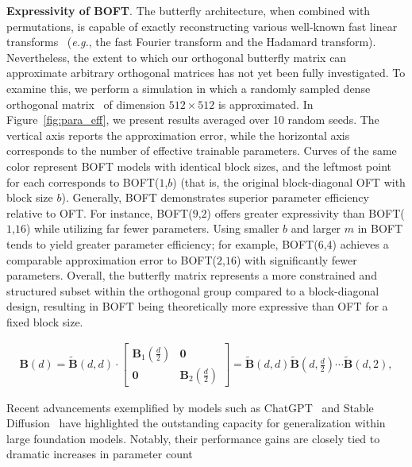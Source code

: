 \textbf{Expressivity of BOFT}. The butterfly architecture, when combined with permutations, is capable of exactly reconstructing various well-known fast linear transforms~\cite{dao2019learning,dao2019kaleidoscope} (\emph{e.g.}, the fast Fourier transform and the Hadamard transform). Nevertheless, the extent to which our orthogonal butterfly matrix can approximate arbitrary orthogonal matrices has not yet been fully investigated. To examine this, we perform a simulation in which a randomly sampled dense orthogonal matrix~\cite{anderson1987generation} of dimension $512\times 512$ is approximated. In Figure~\ref{fig:para_eff}, we present results averaged over 10 random seeds. The vertical axis reports the approximation error, while the horizontal axis corresponds to the number of effective trainable parameters. Curves of the same color represent BOFT models with identical block sizes, and the leftmost point for each corresponds to BOFT($1$,$b$) (that is, the original block-diagonal OFT with block size $b$). Generally, BOFT demonstrates superior parameter efficiency relative to OFT. For instance, BOFT($9$,$2$) offers greater expressivity than BOFT($1$,$16$) while utilizing far fewer parameters. Using smaller $b$ and larger $m$ in BOFT tends to yield greater parameter efficiency; for example, BOFT($6$,$4$) achieves a comparable approximation error to BOFT($2$,$16$) with significantly fewer parameters. Overall, the butterfly matrix represents a more constrained and structured subset within the orthogonal group compared to a block-diagonal design, resulting in BOFT being theoretically more expressive than OFT for a fixed block size.

\begin{equation}
\begin{aligned}
    \!\!\bm{B}(d)=\tilde{\bm{B}}(d,d)\!\cdot\!\begin{bmatrix}
    \bm{B}_1(\frac{d}{2})\!\!\!\!\! & \bm{0} \\
    \bm{0}\!\!\!\!\! &\bm{B}_2(\frac{d}{2})
    \end{bmatrix}= \tilde{\bm{B}}(d,d)\tilde{\bm{B}}(d,\frac{d}{2})\cdots\tilde{\bm{B}}(d,2),
\end{aligned}
\end{equation}

Recent advancements exemplified by models such as ChatGPT~\cite{brown2020language,chen2021evaluating} and Stable Diffusion~\cite{rombach2022high} have highlighted the outstanding capacity for generalization within large foundation models. Notably, their performance gains are closely tied to dramatic increases in parameter count

